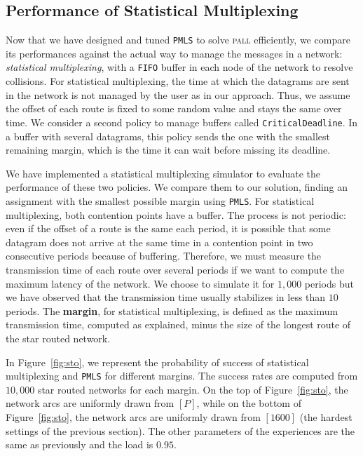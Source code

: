 \documentclass[a4paper,10pt]{journal}
\newcommand\PMLS{\texttt{PMLS}\xspace}
\newcommand\FIFO{\texttt{FIFO}\xspace}
\newcommand\critdead{\texttt{CriticalDeadline}\xspace}
\newcommand\pall{\textsc{pall}\xspace}
\begin{document}
\subsection{Performance of Statistical Multiplexing}

Now that we have designed and tuned \PMLS to solve \pall efficiently, we compare its performances against the actual way to manage the messages in a network: \emph{statistical multiplexing}, with a \FIFO buffer in each node of the network to resolve collisions. For statistical multiplexing, the time at which the datagrams are sent in the network is not managed by the user as in our approach. Thus, we assume the offset of each route is fixed to some random value and stays the same over time.
We consider a second policy to manage buffers called \critdead. In a buffer with several datagrams, this policy sends the one with the smallest remaining margin, which is the time it can wait before missing its deadline.


We have implemented a statistical multiplexing simulator to evaluate the performance of these two policies. We compare them to our solution, finding an assignment with the smallest possible margin using \PMLS.
For statistical multiplexing, both contention points have a buffer. The process is not periodic:
even if the offset of a route is the same each period, it is possible that some datagram does not arrive at the same time in a contention point in two consecutive periods because of buffering. Therefore, we must measure the transmission time of each route over several periods if we want to compute the maximum latency of the network. We choose to simulate it for $1,000$ periods but we have observed that the transmission time usually stabilizes in less than $10$ periods. The \textbf{margin}, for statistical multiplexing, is defined as the maximum transmission time, computed as explained, minus the size of the longest route of the star routed network.

In Figure~\ref{fig:sto}, we represent the probability of success of statistical multiplexing and \PMLS for different margins. The success rates are computed from $10,000$ star routed networks for each margin. On the top of Figure~\ref{fig:sto}, the network arcs are uniformly drawn from $[P]$, while on the bottom of Figure~\ref{fig:sto}, the network arcs are uniformly drawn from $[1600]$ (the hardest settings of the previous section). The other parameters of the experiences are the same as previously and the load is $0.95$.
\end{document}
